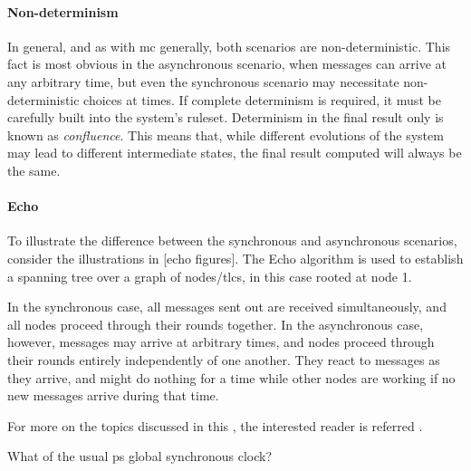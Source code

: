\paragraph{Non-determinism}
In general, and as with \gls{mc} generally, both scenarios are non-deterministic.  This fact is most obvious in the asynchronous scenario, when messages can arrive at any arbitrary time, but even the synchronous scenario may necessitate non-deterministic choices at times.  If complete determinism is required, it must be carefully built into the system's ruleset.  Determinism in the final result only is known as \emph{confluence}.  This means that, while different evolutions of the system may lead to different intermediate states, the final result computed will always be the same.

\paragraph{Echo}
To illustrate the difference between the synchronous and asynchronous scenarios, consider the illustrations in [echo figures].  The Echo algorithm is used to establish a spanning tree over a graph of nodes/\glspl{tlc}, in this case rooted at node 1.

In the synchronous case, all messages sent out are received simultaneously, and all nodes proceed through their rounds together.  In the asynchronous case, however, messages may arrive at arbitrary times, and nodes proceed through their rounds entirely independently of one another.  They react to messages as they arrive, and might do nothing for a time while other nodes are working if no new messages arrive during that time.


For more on the topics discussed in this , the interested reader is referred  \cite{Fokkink2013}.

\begin{anfxwarning}
What of the usual \gls{ps} global synchronous clock?
\end{anfxwarning}